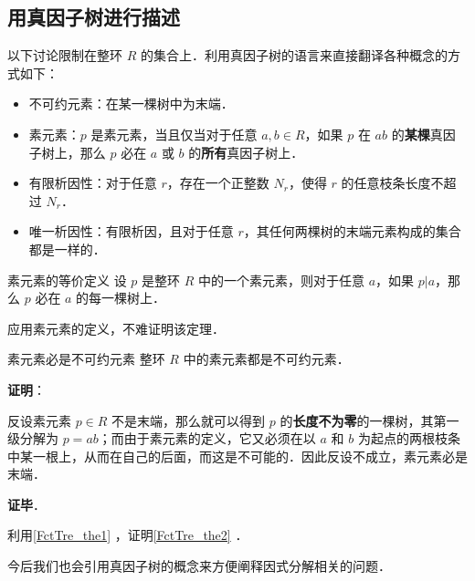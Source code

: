 

\subsection{用真因子树进行描述}

以下讨论限制在整环 $R$ 的集合上．利用真因子树的语言来直接翻译各种概念的方式如下：

\begin{definition}{}\label{FctTre_def1}
\begin{itemize}
\item 不可约元素：在某一棵树中为末端．
\item 素元素：$p$ 是素元素，当且仅当对于任意 $a, b\in R$，如果 $p$ 在 $ab$ 的\textbf{某棵}真因子树上，那么 $p$ 必在 $a$ 或 $b$ 的\textbf{所有}真因子树上．
\item 有限析因性：对于任意 $r$，存在一个正整数 $N_r$，使得 $r$ 的任意枝条长度不超过 $N_r$．
\item 唯一析因性：有限析因，且对于任意 $r$，其任何两棵树的末端元素构成的集合都是一样的．
\end{itemize}
\end{definition}

\begin{theorem}{素元素的等价定义}\label{FctTre_the1}
设 $p$ 是整环 $R$ 中的一个素元素，则对于任意 $a$，如果 $p|a$，那么 $p$ 必在 $a$ 的每一棵树上．
\end{theorem}

应用素元素的定义，不难证明该定理．


\begin{theorem}{素元素必是不可约元素}\label{FctTre_the2}
整环 $R$ 中的素元素都是不可约元素．
\end{theorem}

\textbf{证明}：

反设素元素 $p\in R$ 不是末端，那么就可以得到 $p$ 的\textbf{长度不为零}的一棵树，其第一级分解为 $p=ab$；而由于素元素的定义，它又必须在以 $a$ 和 $b$ 为起点的两根枝条中某一根上，从而在自己的后面，而这是不可能的．因此反设不成立，素元素必是末端．

\textbf{证毕}．

\begin{exercise}{}\label{FctTre_exe1}
利用\autoref{FctTre_the1} ，证明\autoref{FctTre_the2} ．
\end{exercise}

今后我们也会引用真因子树的概念来方便阐释因式分解相关的问题．


